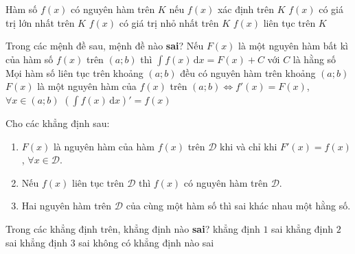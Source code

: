 \begin{ex}%
	Hàm số $f(x)$ có nguyên hàm trên $K$ nếu 
	\choice
	{$f(x)$ xác định trên $K$}
	{$f(x)$ có giá trị lớn nhất trên $K$}
	{$f(x)$ có giá trị nhỏ nhất trên $K$}
	{\True $f(x)$ liên tục trên $K$}
\end{ex}

\begin{ex}%
	Trong các mệnh đề sau, mệnh đề nào \textbf{sai}?
	\choice
	{Nếu $F(x)$ là một nguyên hàm bất kì của hàm số $f(x)$ trên $(a;b)$ thì $\displaystyle\int\limits f(x) \mathrm{\,d}x =F(x)+C$ với $C$ là hằng số}
	{Mọi hàm số liên tục trên khoảng $(a;b)$ đều có nguyên hàm trên khoảng $(a;b)$}
	{\True $F(x)$ là một nguyên hàm của $f(x)$ trên $(a;b)\Leftrightarrow f'(x)=F(x)$, $\forall x\in (a;b)$}
	{$\left(\displaystyle\int\limits f(x) \mathrm{\,d}x\right)'=f(x)$}
\end{ex}

\begin{ex}%
	Cho các khẳng định sau:
	\begin{enumerate}[1.]
		\item $F(x)$ là nguyên hàm của hàm $f(x)$ trên $\mathscr{D}$ khi và chỉ khi $F'(x)=f(x)$, $\forall x\in \mathscr{D}$.
		\item Nếu $f(x)$ liên tục trên $\mathscr{D}$ thì $f(x)$ có nguyên hàm trên $\mathscr{D}$.
		\item Hai nguyên hàm trên $\mathscr{D}$ của cùng một hàm số thì sai khác nhau một hằng số.
	\end{enumerate}
	Trong các khẳng định trên, khẳng định nào \textbf{sai}?
	\choice
	{khẳng định $1$ sai}
	{khẳng định $2$ sai}
	{khẳng định $3$ sai}
	{\True không có khẳng định nào sai}
\end{ex}

